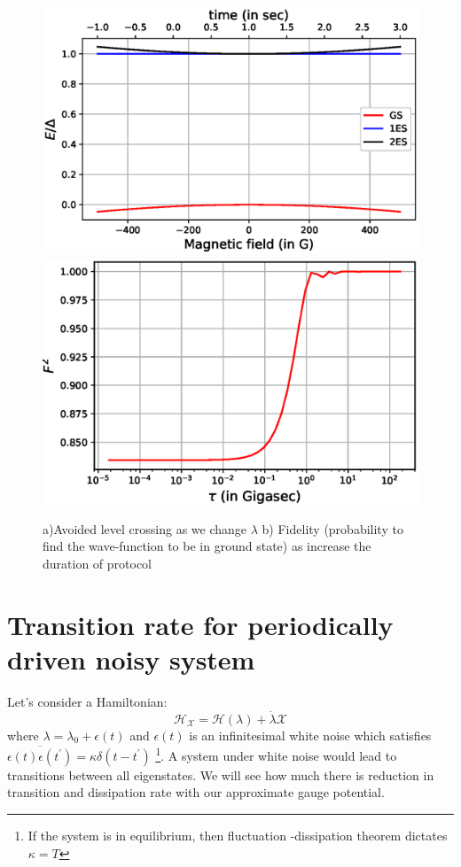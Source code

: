 \documentclass[11pt,a4paper]{article}
\begin{document}
\begin{figure}[!ht]
\begin{center}
\includegraphics[scale=0.5]{pics/energy_NV.eps} 
\includegraphics[scale=0.5]{pics/fidelity_NV_expt.eps}
\caption{a)Avoided level crossing as we change $\lambda$   b) Fidelity (probability to find the wave-function to be in ground state) as increase the duration of protocol}
\label{fid_lz}
\end{center}
\end{figure}

\section{Transition rate for periodically driven noisy system}
Let's consider a Hamiltonian:
\begin{equation}
\mathcal{H}_{\mathcal{X}} = \mathcal{H} (\lambda) + \dot{\lambda} \mathcal{X}
\end{equation}
where $\lambda= \lambda_0 + \epsilon(t)$ and  $\epsilon(t)$  is an infinitesimal white noise which satisfies $\overline{ \epsilon(t) \epsilon(t^{\prime})}= \kappa \delta(t -t^{\prime})$ \footnote{If the system is in equilibrium, then fluctuation -dissipation theorem dictates $\kappa = T$}. 
A system under white noise would lead to transitions between all eigenstates. We will see how much there is reduction in transition and dissipation rate with our approximate gauge potential.
\end{document}
